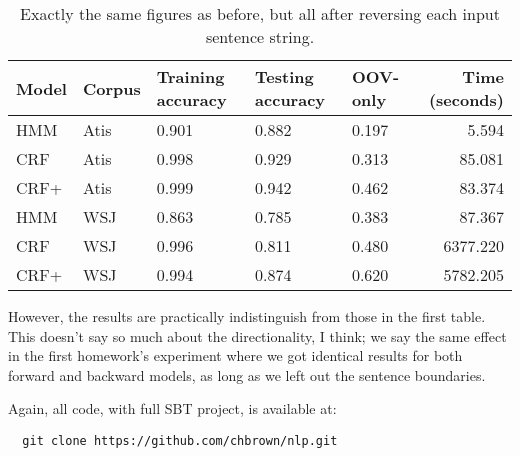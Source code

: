 \documentclass[10pt]{article}\usepackage{graphicx, color}
\begin{document}
\begin{table}[H]
  \centering
  \begin{tabular}{lllllr}
    Model & Corpus & Training accuracy & Testing accuracy & OOV-only & Time (seconds) \\
    \midrule
    HMM   & Atis & 0.901 & 0.882 &
      0.197 & 5.594 \\
    CRF   & Atis & 0.998 & 0.929 &
      0.313 & 85.081 \\
    CRF+ & Atis & 0.999 & 0.942 &
      0.462 & 83.374 \\
    \midrule
    HMM   & WSJ & 0.863 & 0.785 &
      0.383 & 87.367 \\
    CRF   & WSJ & 0.996 & 0.811 &
      0.480 & 6377.220 \\
    CRF+ & WSJ & 0.994 & 0.874 &
      0.620 & 5782.205 \\
  \end{tabular}
  \caption{Exactly the same figures as before, but all after reversing each input sentence string.}
  \label{table:2}
\end{table}
However, the results are practically indistinguish from those in the first table. This doesn't say so much about the directionality, I think; we say the same effect in the first homework's experiment where we got identical results for both forward and backward models, as long as we left out the sentence boundaries.

Again, all code, with full SBT project, is available at:
\begin{lstlisting}
  git clone https://github.com/chbrown/nlp.git
\end{lstlisting}
\end{document}
